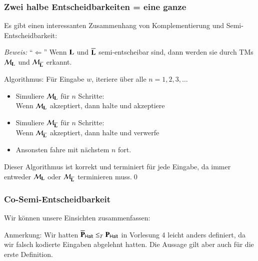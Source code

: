 \documentclass[aspectratio=1610,onlymath]{beamer}
\begin{document}
\begin{frame}[t]\frametitle{Zwei halbe Entscheidbarkeiten = eine ganze}

Es gibt einen interessanten Zusammenhang von Komplementierung und Semi-Entscheidbarkeit:\\[1ex]


\emph{Beweis:} "`$\Leftarrow$"' Wenn $\textbf{\textcolor{black}{L}}$ und $\overline{\textbf{\textcolor{black}{L}}}$ semi-entscheibar sind, dann werden sie durch TMs $\mathcal{M}_{\textbf{\textcolor{black}{L}}}$ und
$\mathcal{M}_{\overline{\textbf{\textcolor{black}{L}}}}$ erkannt.\pause\medskip

Algorithmus: Für Eingabe $w$, iteriere über alle $n=1,2,3,\ldots$
\begin{itemize}
\item Simuliere $\mathcal{M}_{\textbf{\textcolor{black}{L}}}$ für $n$ Schritte:\\
	Wenn $\mathcal{M}_{\textbf{\textcolor{black}{L}}}$ akzeptiert, dann halte und akzeptiere
\item Simuliere $\mathcal{M}_{\overline{\textbf{\textcolor{black}{L}}}}$ für $n$ Schritte:\\
	Wenn $\mathcal{M}_{\overline{\textbf{\textcolor{black}{L}}}}$ akzeptiert, dann halte und verwerfe
\item Ansonsten fahre mit nächstem $n$ fort.
\end{itemize}
Dieser Algorithmus ist korrekt und terminiert für jede Eingabe, da immer
entweder $\mathcal{M}_{\textbf{\textcolor{black}{L}}}$ oder
$\mathcal{M}_{\overline{\textbf{\textcolor{black}{L}}}}$ terminieren muss.\qed

\end{frame}

\begin{frame}\frametitle{Co-Semi-Entscheidbarkeit}

Wir können unsere Einsichten zusammenfassen:\bigskip

\bigskip\pause


{\footnotesize
\textcolor{devilscss}{Anmerkung: Wir hatten $\overline{\textbf{\textcolor{black}{P}}}_{\textsf{Halt}}\leq_T \textbf{\textcolor{black}{P}}_{\textsf{Halt}}$ in Vorlesung 4 leicht anders definiert, da wir falsch kodierte Eingaben abgelehnt hatten. Die Aussage gilt aber auch für die erste Definition.}

}

\end{frame}
\end{document}
